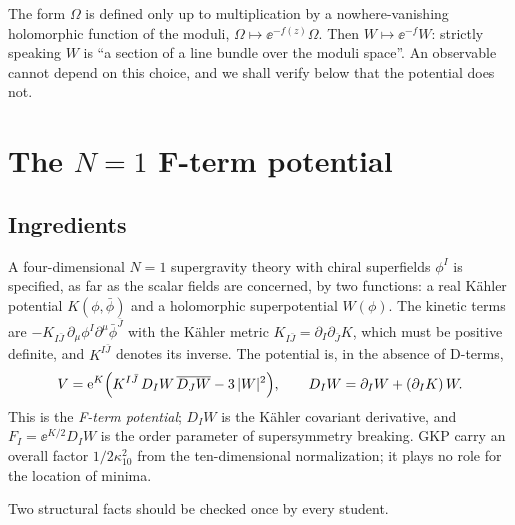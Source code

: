 \begin{remark}\label{rem:stabilization:section}
The form $\Omega$ is defined only up to multiplication by a nowhere-vanishing holomorphic
function of the moduli, $\Omega\mapsto\ee^{-f(z)}\Omega$. Then $W\mapsto\ee^{-f}W$: strictly
speaking $W$ is ``a section of a line bundle over the moduli space''.  An observable cannot depend on this choice, and we shall verify below that the
potential does not.
\end{remark}

\section{The \texorpdfstring{$N=1$}{N = 1} F-term potential}\label{sec:stabilization:fterm}

\subsection{Ingredients}

A four-dimensional $N=1$ supergravity theory with chiral superfields $\phi^I$ is specified, as
far as the scalar fields are concerned, by two functions: a real K\"ahler
potential $K(\phi,\bar\phi)$ and a holomorphic superpotential
$W(\phi)$. The kinetic terms are $-K_{I\bar J}\,\partial_\mu\phi^I\partial^\mu\bar\phi^{\bar J}$
with the K\"ahler metric $K_{I\bar J}=\partial_I\partial_{\bar J}K$, which must be positive
definite, and $K^{I\bar J}$ denotes its inverse. The potential is, in the absence of D-terms,
\begin{equation}\label{eq:stabilization:V}
 V=\mathrm{e}^{K}\Bigl(K^{I\bar J}\,D_IW\,\overline{D_JW}-3\,|W|^2\Bigr),\qquad
 D_IW=\partial_IW+(\partial_IK)\,W .
\end{equation}
This is the \emph{F-term potential}; $D_IW$ is the K\"ahler covariant
derivative, and $F_I=\ee^{K/2}D_IW$ is the order parameter
of supersymmetry breaking. GKP carry an overall factor $1/2\kappa_{10}^2$ from the
ten-dimensional normalization; it plays no role for the location of minima.

Two structural facts should be checked once by every student.

